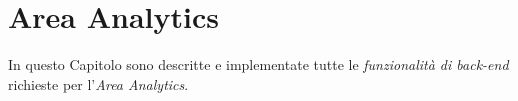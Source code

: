 \chapter{Area Analytics}\label{ch:analytics}
In questo Capitolo sono descritte e implementate tutte le {\it funzionalità di back-end}
richieste per l'{\it Area Analytics}.





